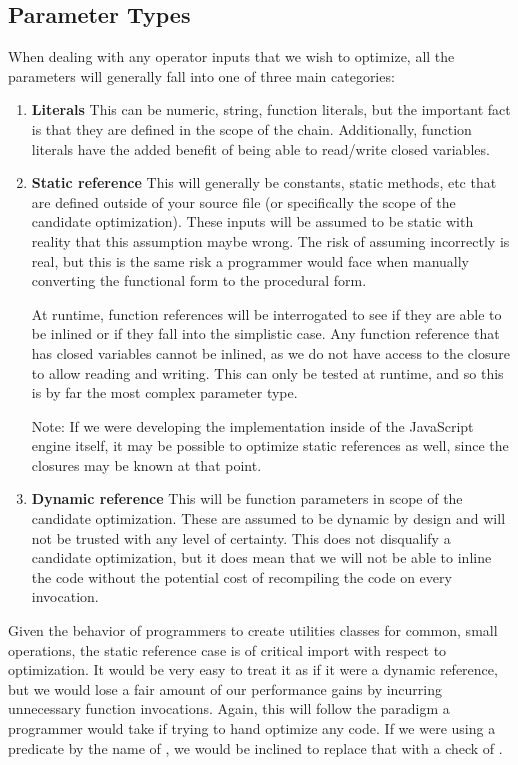 \subsection{Parameter Types}
When dealing with any operator inputs that we wish to optimize, all the parameters will generally fall into one of three main categories:

\begin{enumerate}
  \item \textbf{Literals}
    This can be numeric, string, function literals, but the important fact is that they are defined in the scope of the chain.  Additionally, function literals have the added benefit of being able to read/write closed variables.

  \item \textbf{Static reference}
    This will generally be constants, static methods, etc that are defined outside of your source file (or specifically the scope of the candidate optimization).  These inputs will be assumed to be static with reality that this assumption maybe wrong.  The risk of assuming incorrectly is real, but this is the same risk a programmer would face when manually converting the functional form to the procedural form.  
    
    At runtime, function references will be interrogated to see if they are able to be inlined or if they fall into the simplistic case.  Any function reference that has closed variables cannot be inlined, as we do not have access to the closure to allow reading and writing.  This can only be tested at runtime, and so this is by far the most complex parameter type.  
    
    Note: If we were developing the implementation inside of the JavaScript engine itself, it may be possible to optimize static references as well, since the closures may be known at that point.

  \item \textbf{Dynamic reference}
    This will be function parameters in scope of the candidate optimization. These are assumed to be dynamic by design and will not be trusted with any level of certainty.  This does not disqualify a candidate optimization, but it does mean that we will not be able to inline the code without the potential cost of recompiling the code on every invocation.
\end{enumerate}

Given the behavior of programmers to create utilities classes for common, small operations, the static reference case is of critical import with respect to optimization.  It would be very easy to treat it as if it were a dynamic reference, but we would lose a fair amount of our performance gains by incurring unnecessary function invocations.  Again, this will follow the paradigm a programmer would take if trying to hand optimize any code.  If we were using a predicate by the name of , we would be inclined to replace that with a check of . 